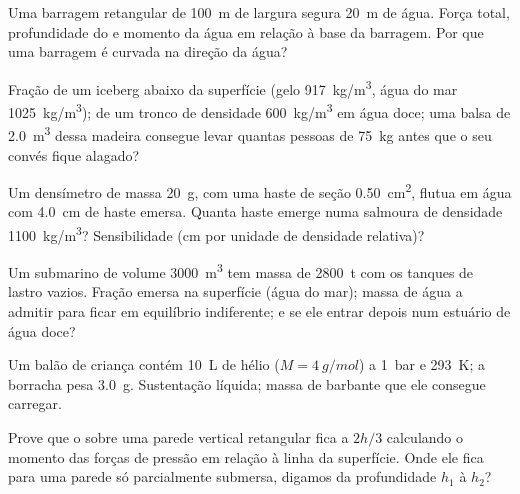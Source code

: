 \begin{exercise}[$\star\star$]\label{exo:b1:fluid-statics:6}
Uma barragem retangular de \qty{100}{m} de largura segura \qty{20}{m} de água. Força
total, profundidade do  e momento da água em relação
à base da barragem. Por que uma barragem é curvada na direção da água?
\end{exercise}

\begin{exercise}[$\star\star$]\label{exo:b1:fluid-statics:7}
Fração de um iceberg abaixo da superfície (gelo \qty{917}{kg/m^3}, água do mar
\qty{1025}{kg/m^3}); de um tronco de densidade \qty{600}{kg/m^3} em água doce;
uma balsa de \qty{2.0}{m^3} dessa madeira consegue levar quantas pessoas de
\qty{75}{kg} antes que o seu convés fique alagado?
\end{exercise}

\begin{exercise}[$\star\star$]\label{exo:b1:fluid-statics:8}
Um densímetro de massa \qty{20}{g}, com uma haste de seção
\qty{0.50}{cm^2}, flutua em água com \qty{4.0}{cm} de haste emersa.
Quanta haste emerge numa salmoura de densidade \qty{1100}{kg/m^3}? Sensibilidade
(cm por unidade de densidade relativa)?
\end{exercise}

\begin{exercise}[$\star\star$]\label{exo:b1:fluid-statics:9}
Um submarino de volume \qty{3000}{m^3} tem massa de \qty{2800}{t} com os tanques
de lastro vazios. Fração emersa na superfície (água do mar); massa de
água a admitir para ficar em equilíbrio indiferente; e se ele entrar depois num
estuário de água doce?
\end{exercise}

\begin{exercise}[$\star\star\star$]\label{exo:b1:fluid-statics:10}
Um balão de criança contém \qty{10}{L} de hélio ($M = \qty{4}{g/mol}$) a
\qty{1}{bar} e \qty{293}{K}; a borracha pesa \qty{3.0}{g}. Sustentação líquida;
massa de barbante que ele consegue carregar.
\end{exercise}

\begin{exercise}[$\star\star\star$]\label{exo:b1:fluid-statics:11}
Prove que o  sobre uma parede vertical retangular fica a
$2h/3$ calculando o momento das forças de pressão em relação à linha da
superfície. Onde ele fica para uma parede só parcialmente submersa,
digamos da profundidade $h_1$ à $h_2$?
\end{exercise}

